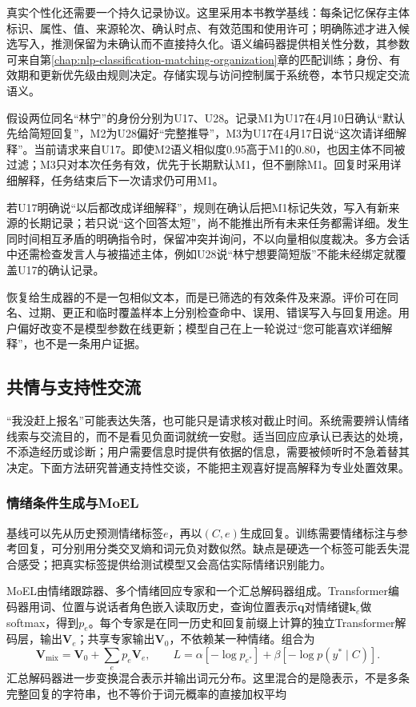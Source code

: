 真实个性化还需要一个持久记录协议。这里采用本书教学基线：每条记忆保存主体标识、属性、值、来源轮次、确认时点、有效范围和使用许可；明确陈述才进入候选写入，推测保留为未确认而不直接持久化。语义编码器提供相关性分数，其参数可来自第\ref{chap:nlp-classification-matching-organization}章的匹配训练；身份、有效期和更新优先级由规则决定。存储实现与访问控制属于系统卷，本节只规定交流语义。

假设两位同名“林宁”的身份分别为U17、U28。记录M1为U17在4月10日确认“默认先给简短回复”，M2为U28偏好“完整推导”，M3为U17在4月17日说“这次请详细解释”。当前请求来自U17。即使M2语义相似度0.95高于M1的0.80，也因主体不同被过滤；M3只对本次任务有效，优先于长期默认M1，但不删除M1。回复时采用详细解释，任务结束后下一次请求仍可用M1。

若U17明确说“以后都改成详细解释”，规则在确认后把M1标记失效，写入有新来源的长期记录；若只说“这个回答太短”，尚不能推出所有未来任务都需详细。发生同时间相互矛盾的明确指令时，保留冲突并询问，不以向量相似度裁决。多方会话中还需检查发言人与被描述主体，例如U28说“林宁想要简短版”不能未经绑定就覆盖U17的确认记录。

恢复给生成器的不是一包相似文本，而是已筛选的有效条件及来源。评价可在同名、过期、更正和临时覆盖样本上分别检查命中、误用、错误写入与回复用途。用户偏好改变不是模型参数在线更新；模型自己在上一轮说过“您可能喜欢详细解释”，也不是一条用户证据。

\subsection{共情与支持性交流}
\label{sec:nlp-dialogue-empathy}

“我没赶上报名”可能表达失落，也可能只是请求核对截止时间。系统需要辨认情绪线索与交流目的，而不是看见负面词就统一安慰。适当回应应承认已表达的处境，不添造经历或诊断；用户需要信息时提供有依据的信息，需要被倾听时不急着替其决定。下面方法研究普通支持性交谈，不能把主观喜好提高解释为专业处置效果。

\subsubsection{情绪条件生成与MoEL}
\label{sec:nlp-dialogue-moel}

基线可以先从历史预测情绪标签$e$，再以$(C,e)$生成回复。训练需要情绪标注与参考回复，可分别用分类交叉熵和词元负对数似然。缺点是硬选一个标签可能丢失混合感受；把真实标签提供给测试模型又会高估实际情绪识别能力。

MoEL由情绪跟踪器、多个情绪回应专家和一个汇总解码器组成。Transformer编码器用词、位置与说话者角色嵌入读取历史，查询位置表示$\bm{q}$对情绪键$\bm{k}_e$做softmax，得到$p_e$。每个专家是在同一历史和回复前缀上计算的独立Transformer解码层，输出$\bm{V}_e$；共享专家输出$\bm{V}_0$，不依赖某一种情绪。组合为
\begin{equation}
 \bm{V}_{\mathrm{mix}}=\bm{V}_0+\sum_e p_e\bm{V}_e,
 \qquad
 L=\alpha[-\log p_{e^*}]+\beta[-\log p(y^*\mid C)].
 \label{eq:nlp-dialogue-moel}
\end{equation}
汇总解码器进一步变换混合表示并输出词元分布。这里混合的是隐表示，不是多条完整回复的字符串，也不等价于词元概率的直接加权平均

